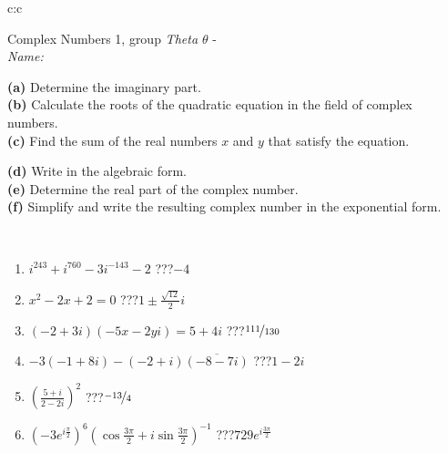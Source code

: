 \documentclass[10pt]{report}
\begin{document}
\begin{tabular}{c:c}
\begin{minipage}[c][104.5mm][t]{0.5\linewidth}
\begin{center}
{\huge Complex Numbers 1, group \textit{Theta $\theta$} -}\\[5mm]
\textit{Name:}\phantom{xxxxxxxxxxxxxxxxxxxxxxxxxxxxxxxxxxxxxxxxxxxxxxxxxxxxxxxxxxxxxxxxx}\\[5mm]
\begin{minipage}{0.95\linewidth}
\begin{center}
{\small \begin{minipage}{0.44\textwidth} \raggedright
\textbf{(a)} Determine the imaginary part. \\[1mm]
\textbf{(b)} Calculate the roots of the quadratic equation in the field of complex numbers. \\[1mm]
\textbf{(c)} Find the sum of the real numbers \(x\) and \(y\) that satisfy the equation. \end{minipage} \begin{minipage}{0.54\textwidth}
\textbf{(d)} Write in the algebraic form. \\[1mm]
\textbf{(e)} Determine the real part of the complex number. \\[1mm]
\textbf{(f)} Simplify and write the resulting complex number in the exponential form.
\end{minipage}
} \vspace{3mm}
\end{center}
\end{minipage}
\\[1mm]
\begin{minipage}{0.79\linewidth}
\begin{center}
\begin{varwidth}{\linewidth}
\setlength{\itemsep}{0pt}
\begin{enumerate}
\large
\item $i^{243}+i^{760}-3i^{-143}-2$\quad \dotfill\; ???\;\dotfill \quad $-4$
\item $x^2-2x+2=0$\quad \dotfill\; ???\;\dotfill \quad $1 \pm{}\frac{ \sqrt{12}}{2}i$
\item $(-2+3i)(-5x-2yi)=5+4i$\quad \dotfill\; ???\;\dotfill \quad $\nicefrac{111}{130}$
\item $-3(-1+8i)-(-2+i)\overline{(-8-7i)}$\quad \dotfill\; ???\;\dotfill \quad $1-2i$
\item $\left(\frac{5+i}{2-2i}\right)^2$\quad \dotfill\; ???\;\dotfill \quad $\nicefrac{-13}{4}$
\item $\left(-3e^{i\frac{\pi}{2}}\right)^{6}\left(\cos{\frac{3\pi}{2}}+i\sin{\frac{3\pi}{2}}\right)^{-1}$\quad \dotfill\; ???\;\dotfill \quad $729e^{i\frac{3\pi}{2}}$

\end{enumerate}
\end{varwidth}
\end{center}
\end{minipage}
\end{center}
\end{minipage}
\end{tabular}
\end{document}

